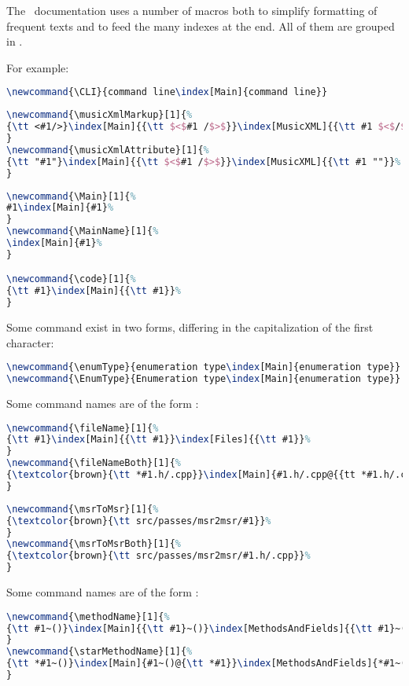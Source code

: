 The \mf\ documentation uses a number of macros both to simplify formatting of frequent texts and to feed the many indexes at the end. All of them are grouped in .

For example:
\begin{lstlisting}[language=Latex]
\newcommand{\CLI}{command line\index[Main]{command line}}
\end{lstlisting}

\begin{lstlisting}[language=Latex]
\newcommand{\musicXmlMarkup}[1]{%
{\tt <#1/>}\index[Main]{{\tt $<$#1 /$>$}}\index[MusicXML]{{\tt #1 $<$/$>$}}%
}
\newcommand{\musicXmlAttribute}[1]{%
{\tt "#1"}\index[Main]{{\tt $<$#1 /$>$}}\index[MusicXML]{{\tt #1 ""}}%
}
\end{lstlisting}

\begin{lstlisting}[language=Latex]
\newcommand{\Main}[1]{%
#1\index[Main]{#1}%
}
\newcommand{\MainName}[1]{%
\index[Main]{#1}%
}

\newcommand{\code}[1]{%
{\tt #1}\index[Main]{{\tt #1}}%
}
\end{lstlisting}

Some command exist in two forms, differing in the capitalization of the first character:
\begin{lstlisting}[language=Latex]
\newcommand{\enumType}{enumeration type\index[Main]{enumeration type}}
\newcommand{\EnumType}{Enumeration type\index[Main]{enumeration type}}
\end{lstlisting}

Some command names are of the form :
\begin{lstlisting}[language=Latex]
\newcommand{\fileName}[1]{%
{\tt #1}\index[Main]{{\tt #1}}\index[Files]{{\tt #1}}%
}
\newcommand{\fileNameBoth}[1]{%
{\textcolor{brown}{\tt *#1.h/.cpp}}\index[Main]{#1.h/.cpp@{{tt *#1.h/.cpp}}}\index[Files]{#1.h/.cpp@{{tt *#1.h/.cpp}}}%
}
\end{lstlisting}

\begin{lstlisting}[language=Latex]
\newcommand{\msrToMsr}[1]{%
{\textcolor{brown}{\tt src/passes/msr2msr/#1}}%
}
\newcommand{\msrToMsrBoth}[1]{%
{\textcolor{brown}{\tt src/passes/msr2msr/#1.h/.cpp}}%
}
\end{lstlisting}

Some command names are of the form :
\begin{lstlisting}[language=Latex]
\newcommand{\methodName}[1]{%
{\tt #1~()}\index[Main]{{\tt #1}~()}\index[MethodsAndFields]{{\tt #1}~()}%
}
\newcommand{\starMethodName}[1]{%
{\tt *#1~()}\index[Main]{#1~()@{\tt *#1}}\index[MethodsAndFields]{*#1~()@{\tt *#1~()}}%
}
\end{lstlisting}


